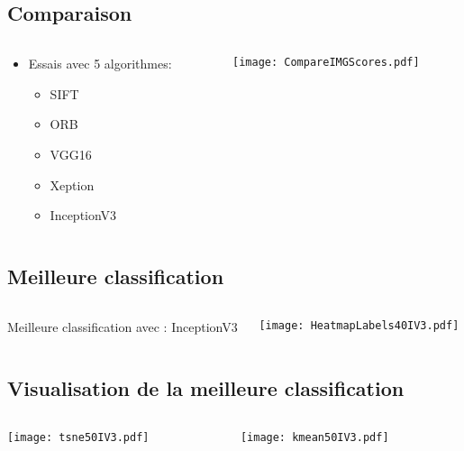 \documentclass[8pt,aspectratio=169,hyperref={unicode=true}]{beamer}
\begin{document}
\subsection{Comparaison}
\begin{frame}{\insertsubsection}
    \begin{columns}
        \begin{column}{.4\textwidth}
            \begin{itemize}
                \item Essais avec 5 algorithmes:
                      \begin{itemize}
                          \item SIFT
                          \item ORB
                          \item VGG16
                          \item Xeption
                          \item InceptionV3
                      \end{itemize}
            \end{itemize}
        \end{column}
        \begin{column}{.6\textwidth}
            \texttt{[image: CompareIMGScores.pdf]}
        \end{column}
    \end{columns}
\end{frame}

\subsection{Meilleure classification}
\begin{frame}{\insertsubsection}
    \begin{columns}
        \begin{column}{.4\textwidth}
            Meilleure classification avec : InceptionV3
        \end{column}
        \begin{column}{.6\textwidth}
            \texttt{[image: HeatmapLabels40IV3.pdf]}
        \end{column}
    \end{columns}
\end{frame}

\subsection{Visualisation de la meilleure classification}
\begin{frame}{\insertsubsection}
\begin{columns}
    \begin{column}{.5\textwidth}
        \texttt{[image: tsne50IV3.pdf]}
    \end{column}
    \begin{column}{.5\textwidth}
        \texttt{[image: kmean50IV3.pdf]}
    \end{column}
\end{columns}
\end{frame}
\end{document}
